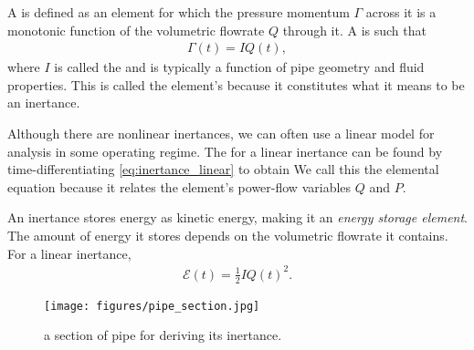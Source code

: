 \documentclass[dynamic_systems.tex]{subfiles}
\begin{document}
A  is defined as an element for which the pressure momentum $\Gamma$ across it is a monotonic function of the volumetric flowrate $Q$ through it.
A  is such that
\begin{align}
\label{eq:inertance_linear}
	\Gamma(t) = I Q(t),
\end{align}
where $I$ is called the  and is typically a function of pipe geometry and fluid properties.
This is called the element's  because it constitutes what it means to be an inertance.


Although there are nonlinear inertances, we can often use a linear model for analysis in some operating regime.
The  for a linear inertance can be found by time-differentiating \autoref{eq:inertance_linear} to obtain
We call this the elemental equation because it relates the element's power-flow variables $Q$ and $P$.

An inertance stores energy as kinetic energy, making it an \emph{energy storage element}.
The amount of energy it stores depends on the volumetric flowrate it contains.
For a linear inertance,
\begin{align}
	\mathcal{E}(t) = \frac{1}{2} I Q(t)^2.
\end{align}

\begin{wrapfigure}[8]{r}{0.4\textwidth}
  \centering
	\texttt{[image: figures/pipe\_section.jpg]}
  \caption{\label{fig:pipe_section} a section of pipe for deriving its inertance.}%
\end{wrapfigure}
\end{document}
